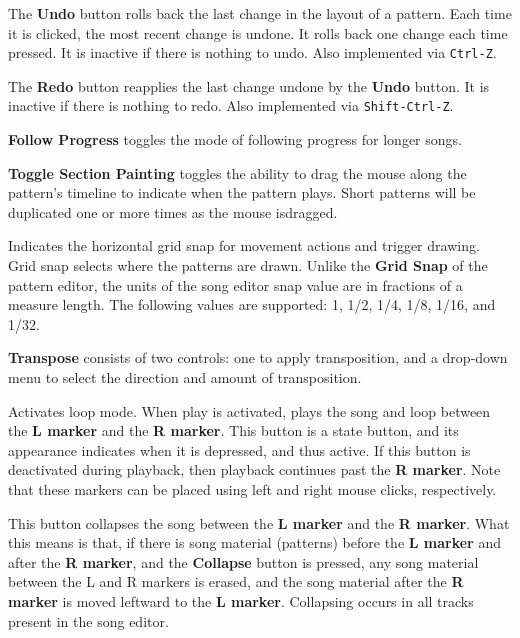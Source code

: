    The \textbf{Undo} button rolls back the last change in the layout of a
   pattern.  Each time it is clicked, the most recent change is undone.
   It rolls back one change each time pressed.
   It is inactive if there is nothing to undo.
   Also implemented via \texttt{Ctrl-Z}.

   The \textbf{Redo} button reapplies the last change undone by
   the \textbf{Undo} button.  It is inactive if there is nothing to redo.
   Also implemented via \texttt{Shift-Ctrl-Z}.

      \textbf{Follow Progress} toggles the mode of following progress
         for longer songs.

      \textbf{Toggle Section Painting} toggles the ability
      to drag the mouse along the pattern's timeline to indicate when the
      pattern plays.  Short patterns will be duplicated one or more times as
      the mouse isdragged.

   Indicates the horizontal grid snap for movement actions and trigger drawing.
   Grid snap selects where the patterns are drawn.
   Unlike the \textbf{Grid Snap} of the pattern editor, the units
   of the song editor snap value are in fractions of a measure length.
   The following values are supported:
   1, 1/2, 1/4, 1/8, 1/16, and 1/32.

   \textbf{Transpose} consists of two controls: one to apply
   transposition, and a drop-down menu to select the direction and amount
   of transposition.

   Activates loop mode. When play is activated, plays the song and loop
   between the
   \textbf{L marker} and the \textbf{R marker}.
   This button is a state button, and its appearance indicates when it is
   depressed, and thus active.
   If this button is deactivated during playback, then playback
   continues past the \textbf{R marker}.
   Note that these markers can be placed using left
   and right mouse clicks, respectively.

   This button collapses the song between the \textbf{L marker} and the
   \textbf{R marker}.
   What this means is that, if there is song material (patterns) before the
   \textbf{L marker} and after the \textbf{R marker},
   and the \textbf{Collapse} button is
   pressed, any song material between the L and R markers is erased, and
   the song material after the \textbf{R marker} is moved leftward to
   the \textbf{L marker}.
   Collapsing occurs in all tracks present in the song editor.

